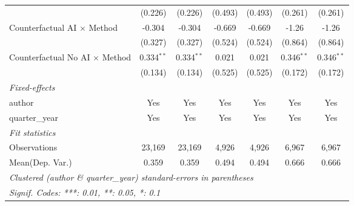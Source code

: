 \begin{tabular}{lcccccc}
                                         & (0.226)       & (0.226)       & (0.493)       & (0.493)       & (0.261)       & (0.261)\\   
   Counterfactual AI $\times$ Method     & -0.304        & -0.304        & -0.669        & -0.669        & -1.26         & -1.26\\   
                                         & (0.327)       & (0.327)       & (0.524)       & (0.524)       & (0.864)       & (0.864)\\   
   Counterfactual No AI $\times$ Method  & 0.334$^{**}$  & 0.334$^{**}$  & 0.021         & 0.021         & 0.346$^{**}$  & 0.346$^{**}$\\   
                                         & (0.134)       & (0.134)       & (0.525)       & (0.525)       & (0.172)       & (0.172)\\   
   \midrule
   \emph{Fixed-effects}\\
   author                                & Yes           & Yes           & Yes           & Yes           & Yes           & Yes\\  
   quarter\_year                         & Yes           & Yes           & Yes           & Yes           & Yes           & Yes\\  
   \midrule
   \emph{Fit statistics}\\
   Observations                          & 23,169        & 23,169        & 4,926         & 4,926         & 6,967         & 6,967\\  
Mean(Dep. Var.) & 0.359 & 0.359 & 0.494 & 0.494 & 0.666 & 0.666 \\
   \midrule \midrule
   \multicolumn{7}{l}{\emph{Clustered (author \& quarter\_year) standard-errors in parentheses}}\\
   \multicolumn{7}{l}{\emph{Signif. Codes: ***: 0.01, **: 0.05, *: 0.1}}\\
\end{tabular}
\par\endgroup
